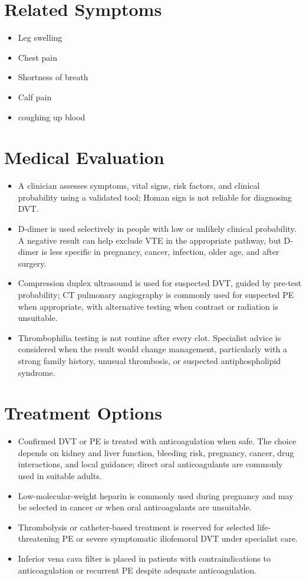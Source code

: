 \section*{Related Symptoms}
\begin{itemize}
 \item Leg swelling
 \item Chest pain
 \item Shortness of breath
 \item Calf pain
 \item coughing up blood
\end{itemize}


\section*{Medical Evaluation}
\begin{itemize}
 \item A clinician assesses symptoms, vital signs, risk factors, and clinical probability using a validated tool; Homan sign is not reliable for diagnosing DVT.
 \item D-dimer is used selectively in people with low or unlikely clinical probability. A negative result can help exclude VTE in the appropriate pathway, but D-dimer is less specific in pregnancy, cancer, infection, older age, and after surgery.
 \item Compression duplex ultrasound is used for suspected DVT, guided by pre-test probability; CT pulmonary angiography is commonly used for suspected PE when appropriate, with alternative testing when contrast or radiation is unsuitable.
 \item Thrombophilia testing is not routine after every clot. Specialist advice is considered when the result would change management, particularly with a strong family history, unusual thrombosis, or suspected antiphospholipid syndrome.
\end{itemize}

\section*{Treatment Options}
\begin{itemize}
 \item Confirmed DVT or PE is treated with anticoagulation when safe. The choice depends on kidney and liver function, bleeding risk, pregnancy, cancer, drug interactions, and local guidance; direct oral anticoagulants are commonly used in suitable adults.
 \item Low-molecular-weight heparin is commonly used during pregnancy and may be selected in cancer or when oral anticoagulants are unsuitable.
 \item Thrombolysis or catheter-based treatment is reserved for selected life-threatening PE or severe symptomatic iliofemoral DVT under specialist care.
 \item Inferior vena cava filter is placed in patients with contraindications to anticoagulation or recurrent PE despite adequate anticoagulation.
\end{itemize}

